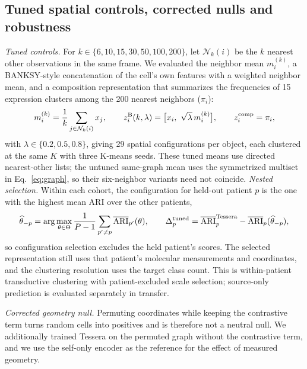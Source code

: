 \documentclass[11pt]{article}
\begin{document}
\subsection{Tuned spatial controls, corrected nulls and robustness}\label{sec:robustness}
\emph{Tuned controls.} For \(k\in\{6,10,15,30,50,100,200\}\), let \(\mathcal N_k(i)\) be the \(k\) nearest other observations in the same frame. We evaluated the neighbor mean \(m_i^{(k)}\), a BANKSY-style concatenation of the cell's own features with a weighted neighbor mean, and a composition representation that summarizes the frequencies of 15 expression clusters among the 200 nearest neighbors (\(\pi_i\)):
\begin{equation}
m_i^{(k)}=\frac1k\sum_{j\in\mathcal N_k(i)}x_j,\qquad
z_i^{\rm B}(k,\lambda)=\bigl[x_i,\ \sqrt\lambda\,m_i^{(k)}\bigr],\qquad
z_i^{\rm comp}=\pi_i,\label{eq:tuned}
\end{equation}
with \(\lambda\in\{0.2,0.5,0.8\}\), giving 29 spatial configurations per object, each clustered at the same \(K\) with three K-means seeds. These tuned means use directed nearest-other lists; the untuned same-graph mean uses the symmetrized multiset in Eq.~\eqref{eq:graph}, so their six-neighbor variants need not coincide. \emph{Nested selection.} Within each cohort, the configuration for held-out patient \(p\) is the one with the highest mean ARI over the other patients,
\begin{equation}
\widehat\theta_{-p}=\arg\max_{\theta\in\Theta}\frac{1}{P-1}\sum_{p'\ne p}\overline{\operatorname{ARI}}_{p'}(\theta),\qquad
\Delta^{\rm tuned}_p=\overline{\operatorname{ARI}}_p^{\rm Tessera}-\overline{\operatorname{ARI}}_p(\widehat\theta_{-p}),\label{eq:nested}
\end{equation}
so configuration selection excludes the held patient's scores. The selected representation still uses that patient's molecular measurements and coordinates, and the clustering resolution uses the target class count. This is within-patient transductive clustering with patient-excluded scale selection; source-only prediction is evaluated separately in transfer.

\emph{Corrected geometry null.} Permuting coordinates while keeping the contrastive term turns random cells into positives and is therefore not a neutral null. We additionally trained Tessera on the permuted graph without the contrastive term, and we use the self-only encoder as the reference for the effect of measured geometry.
\end{document}
